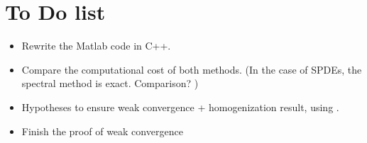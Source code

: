\section*{To Do list}
\begin{itemize}
    \item Rewrite the Matlab code in C++.
    \item Compare the computational cost of both methods. (In the case of SPDEs, the spectral method is exact. Comparison? )
    \item Hypotheses to ensure weak convergence + homogenization result, using \cite{pardoux2001poisson}.
    \item Finish the proof of weak convergence
\end{itemize}

